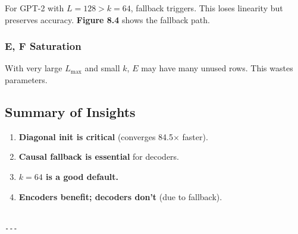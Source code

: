 For GPT-2 with $L = 128 > k = 64$, fallback triggers. This loses linearity 
but preserves accuracy. \textbf{Figure 8.4} shows the fallback path.

\subsubsection{E, F Saturation}

With very large $L_\text{max}$ and small $k$, $E$ may have many unused rows. 
This wastes parameters.

\subsection{Summary of Insights}

\begin{enumerate}
\item \textbf{Diagonal init is critical} (converges 84.5$\times$ faster).
\item \textbf{Causal fallback is essential} for decoders.
\item \textbf{$k = 64$ is a good default.}
\item \textbf{Encoders benefit; decoders don't} (due to fallback).
\end{enumerate}
\begin{lstlisting}

---
\end{lstlisting}